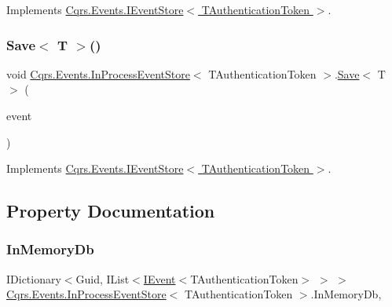 Implements \hyperlink{interfaceCqrs_1_1Events_1_1IEventStore_a81fb586703e7c6dea6b23d9a95f3887a_a81fb586703e7c6dea6b23d9a95f3887a}{Cqrs.\+Events.\+I\+Event\+Store$<$ T\+Authentication\+Token $>$}.

\mbox{\label{classCqrs_1_1Events_1_1InProcessEventStore_ace191a5083a6ddd308dbbc302dc5bd8e_ace191a5083a6ddd308dbbc302dc5bd8e}} 
\subsubsection{\texorpdfstring{Save$<$ T $>$()}{Save< T >()}}
{\footnotesize\ttfamily void \hyperlink{classCqrs_1_1Events_1_1InProcessEventStore}{Cqrs.\+Events.\+In\+Process\+Event\+Store}$<$ T\+Authentication\+Token $>$.\hyperlink{classCqrs_1_1Events_1_1InProcessEventStore_a93e6d7dc5b81ffba6a89cf22b273d0c9_a93e6d7dc5b81ffba6a89cf22b273d0c9}{Save}$<$ T $>$ (\begin{DoxyParamCaption}\item[{\hyperlink{interfaceCqrs_1_1Events_1_1IEvent}{I\+Event}$<$ T\+Authentication\+Token $>$ @}]{event }\end{DoxyParamCaption})}



Implements \hyperlink{interfaceCqrs_1_1Events_1_1IEventStore_a92e768243d6602d09b786bbd06811ce6_a92e768243d6602d09b786bbd06811ce6}{Cqrs.\+Events.\+I\+Event\+Store$<$ T\+Authentication\+Token $>$}.



\subsection{Property Documentation}
\mbox{\label{classCqrs_1_1Events_1_1InProcessEventStore_a4d0dee81baa7348a2d16fd0878220bd4_a4d0dee81baa7348a2d16fd0878220bd4}} 
\subsubsection{\texorpdfstring{In\+Memory\+Db}{InMemoryDb}}
{\footnotesize\ttfamily I\+Dictionary$<$Guid, I\+List$<$\hyperlink{interfaceCqrs_1_1Events_1_1IEvent}{I\+Event}$<$T\+Authentication\+Token$>$ $>$ $>$ \hyperlink{classCqrs_1_1Events_1_1InProcessEventStore}{Cqrs.\+Events.\+In\+Process\+Event\+Store}$<$ T\+Authentication\+Token $>$.In\+Memory\+Db\hspace{0.3cm}{\ttfamily [get]}, {\ttfamily [protected]}}

